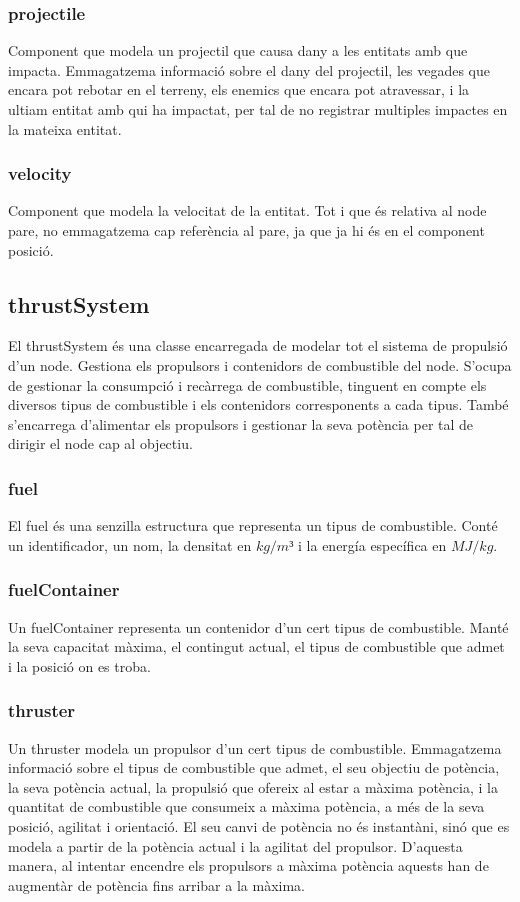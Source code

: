 \subsubsection{projectile}
Component que modela un projectil que causa dany a les entitats amb que impacta. Emmagatzema informació sobre el dany del projectil, les vegades que encara pot rebotar en el terreny, els enemics que encara pot atravessar, i la ultiam entitat amb qui ha impactat, per tal de no registrar multiples impactes en la mateixa entitat.
\subsubsection{velocity}
Component que modela la velocitat de la entitat. Tot i que és relativa al node pare, no emmagatzema cap referència al pare, ja que ja hi és en el component posició.
\subsection{thrustSystem}
El thrustSystem és una classe encarregada de modelar tot el sistema de propulsió d'un node. Gestiona els propulsors i contenidors de combustible del node.
S'ocupa de gestionar la consumpció i recàrrega de combustible, tinguent en compte els diversos tipus de combustible i els contenidors corresponents a cada tipus. També s'encarrega d'alimentar els propulsors i gestionar la seva potència per tal de dirigir el node cap al objectiu.
\subsubsection{fuel}
El fuel és una senzilla estructura que representa un tipus de combustible. Conté un identificador, un nom, la densitat en $kg/m³$ i la energía específica en $MJ/kg$.
\subsubsection{fuelContainer}
Un fuelContainer representa un contenidor d'un cert tipus de combustible. Manté la seva capacitat màxima, el contingut actual, el tipus de combustible que admet i la posició on es troba.
\subsubsection{thruster}
Un thruster modela un propulsor d'un cert tipus de combustible. Emmagatzema informació sobre el tipus de combustible que admet, el seu objectiu de potència, la seva potència actual, la propulsió que ofereix al estar a màxima potència, i la quantitat de combustible que consumeix a màxima potència, a més de la seva posició, agilitat i orientació.
El seu canvi de potència no és instantàni, sinó que es modela a partir de la potència actual i la agilitat del propulsor. D'aquesta manera, al intentar encendre els propulsors a màxima potència aquests han de augmentàr de potència fins arribar a la màxima.
